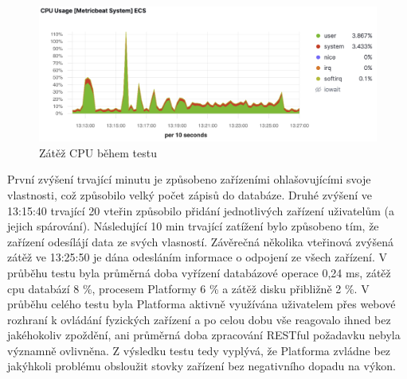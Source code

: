 \begin{figure}[htbp]
    \centering
    \includegraphics[width=\textwidth]{img/cpu_usage.png}
    \caption{Zátěž CPU během testu}
\end{figure}

První zvýšení trvající minutu je způsobeno zařízeními ohlašovujícími svoje vlastnosti, což způsobilo velký počet zápisů do databáze. Druhé zvýšení ve 13:15:40 trvající 20 vteřin způsobilo přidání jednotlivých zařízení uživatelům (a jejich spárování). Následující 10 min trvající zatížení bylo způsobeno tím, že zařízení odesílájí data ze svých vlasností. Závěrečná několika vteřinová zvýšená zátěž ve 13:25:50 je dána odesláním informace o odpojení ze všech zařízení. V průběhu testu byla průměrná doba vyřízení databázové operace 0,24 ms, zátěž cpu databází 8 \%, procesem Platformy 6 \% a zátěž disku přibližně 2 \%. V průběhu celého testu byla Platforma aktivně využívána uživatelem přes webové rozhraní k ovládání fyzických zařízení a po celou dobu vše reagovalo ihned bez jakéhokoliv zpoždění, ani průměrná doba zpracování RESTful požadavku nebyla významně ovlivněna. Z výsledku testu tedy vyplývá, že Platforma zvládne bez jakýhkoli problému obsloužit stovky zařízení bez negativního dopadu na výkon.




